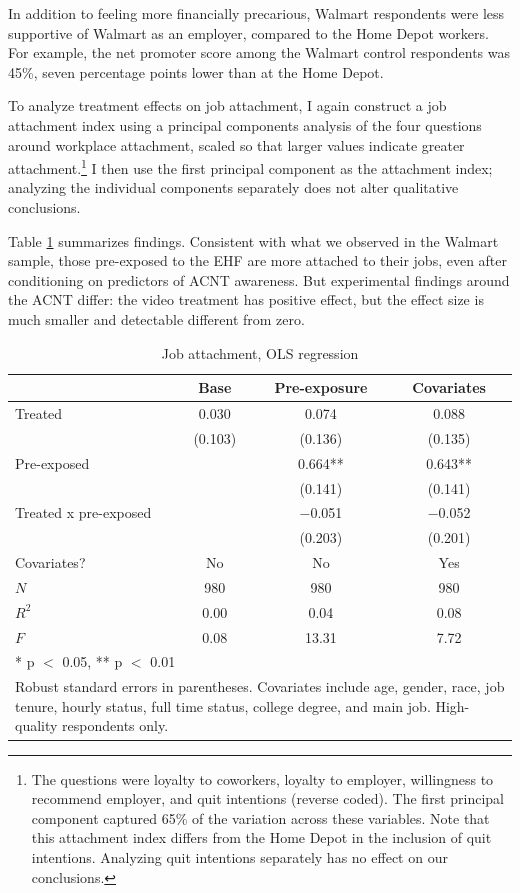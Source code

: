 \documentclass[
  11pt,
  oneside]{article}
\begin{document}
In addition to feeling more financially precarious, Walmart respondents were less supportive of Walmart as an employer, compared to the Home Depot workers. For example, the net promoter score among the Walmart control respondents was 45\%, seven percentage points lower than at the Home Depot.

To analyze treatment effects on job attachment, I again construct a job attachment index using a principal components analysis of the four questions around workplace attachment, scaled so that larger values indicate greater attachment.\footnote{The questions were loyalty to coworkers, loyalty to employer, willingness to recommend employer, and quit intentions (reverse coded). The first principal component captured 65\% of the variation across these variables. Note that this attachment index differs from the Home Depot in the inclusion of quit intentions. Analyzing quit intentions separately has no effect on our conclusions.} I then use the first principal component as the attachment index; analyzing the individual components separately does not alter qualitative conclusions.

Table \ref{tab:tab-attachment-models-wmt} summarizes findings. Consistent with what we observed in the Walmart sample, those pre-exposed to the EHF are more attached to their jobs, even after conditioning on predictors of ACNT awareness. But experimental findings around the ACNT differ: the video treatment has positive effect, but the effect size is much smaller and detectable different from zero.

\begin{table}
\centering
\caption{\label{tab:tab-attachment-models-wmt}Job attachment, OLS regression \label{tab:tab-attachment-models-wmt}}
\centering
\begin{tabular}[t]{lccc}
\toprule
  & Base & Pre-exposure & Covariates\\
\midrule
Treated & \num{0.030} & \num{0.074} & \num{0.088}\\
 & (\num{0.103}) & (\num{0.136}) & (\num{0.135})\\
Pre-exposed &  & \num{0.664}** & \num{0.643}**\\
 &  & (\num{0.141}) & (\num{0.141})\\
Treated x pre-exposed &  & \num{-0.051} & \num{-0.052}\\
 &  & (\num{0.203}) & (\num{0.201})\\
\midrule
Covariates? & No & No & Yes\\
$N$ & \num{980} & \num{980} & \num{980}\\
$R^2$ & \num{0.00} & \num{0.04} & \num{0.08}\\
$F$ & \num{0.08} & \num{13.31} & \num{7.72}\\
\bottomrule
\multicolumn{4}{l}{\rule{0pt}{1em}* p $<$ 0.05, ** p $<$ 0.01}\\
\multicolumn{4}{l}{\rule{0pt}{1em}Robust standard errors in parentheses. Covariates include age, gender, race, job tenure, hourly status, full time status, college degree, and main job.  High-quality respondents only.}\\
\end{tabular}
\end{table}
\end{document}
